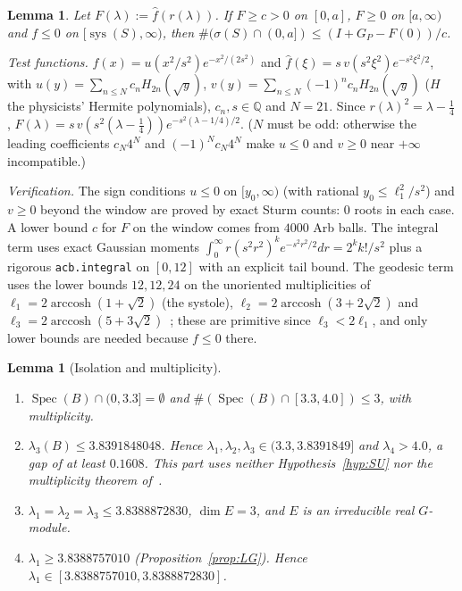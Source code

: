 \documentclass[11pt]{amsart}
\newtheorem{lemma}[theorem]{Lemma}
\theoremstyle{definition}
\theoremstyle{remark}
\newcommand{\Q}{\mathbb{Q}}
\newcommand{\Spec}{\operatorname{Spec}}
\newcommand{\arccosh}{\operatorname{arccosh}}
\begin{document}
\begin{lemma}\label{lem:LemmaA}
Let $F(\lambda):=\hat f(r(\lambda))$. If $F\ge c>0$ on $[0,a]$, $F\ge0$ on $[a,\infty)$ and $f\le0$ on
$[\operatorname{sys}(S),\infty)$, then $\#(\sigma(S)\cap(0,a])\le(I+G_P-F(0))/c$.
\end{lemma}

\emph{Test functions.} $f(x)=u(x^2/s^2)e^{-x^2/(2s^2)}$ and $\hat f(\xi)=s\,v(s^2\xi^2)e^{-s^2\xi^2/2}$, with
$u(y)=\sum_{n\le N}c_nH_{2n}(\sqrt y)$, $v(y)=\sum_{n\le N}(-1)^nc_nH_{2n}(\sqrt y)$ ($H$ the physicists'
Hermite polynomials), $c_n,s\in\Q$ and $N=21$. Since $r(\lambda)^2=\lambda-\tfrac14$,
$F(\lambda)=s\,v(s^2(\lambda-\tfrac14))e^{-s^2(\lambda-1/4)/2}$. ($N$ must be odd: otherwise the leading
coefficients $c_N4^N$ and $(-1)^Nc_N4^N$ make $u\le0$ and $v\ge0$ near $+\infty$ incompatible.)

\emph{Verification.} The sign conditions $u\le0$ on $[y_0,\infty)$ (with rational $y_0\le\ell_1^2/s^2$) and
$v\ge0$ beyond the window are proved by exact Sturm counts: $0$ roots in each case. A lower bound $c$
for $F$ on the window comes from $4000$ Arb balls. The integral term uses exact Gaussian moments
$\int_0^\infty r(s^2r^2)^ke^{-s^2r^2/2}dr=2^kk!/s^2$ plus a rigorous \texttt{acb.integral} on $[0,12]$ with
an explicit tail bound. The geodesic term uses the lower bounds $12,12,24$ on the unoriented
multiplicities of $\ell_1=2\arccosh(1+\sqrt2)$ (the systole), $\ell_2=2\arccosh(3+2\sqrt2)$ and
$\ell_3=2\arccosh(5+3\sqrt2)$~\cite[\S7.4]{FBP-K}; these are primitive since $\ell_3<2\ell_1$, and only
lower bounds are needed because $f\le0$ there.

\begin{lemma}[Isolation and multiplicity]\label{lem:isolation}
\begin{enumerate}[label=\textup{(\alph*)}]
\item $\Spec(B)\cap(0,3.3]=\emptyset$ and $\#(\Spec(B)\cap[3.3,4.0])\le3$, with multiplicity.
\item $\lambda_3(B)\le3.8391848048$. Hence $\lambda_1,\lambda_2,\lambda_3\in(3.3,3.8391849]$ and
$\lambda_4>4.0$, a gap of at least $0.1608$. This part uses neither Hypothesis~\ref{hyp:SU} nor the
multiplicity theorem of~\cite{FBP-K}.
\item $\lambda_1=\lambda_2=\lambda_3\le3.8388872830$, $\dim E=3$, and $E$ is an irreducible real
$G$-module.
\item $\lambda_1\ge3.8388757010$ (Proposition~\ref{prop:LG}). Hence
$\lambda_1\in[3.8388757010,3.8388872830]$.
\end{enumerate}
\end{lemma}
\end{document}
